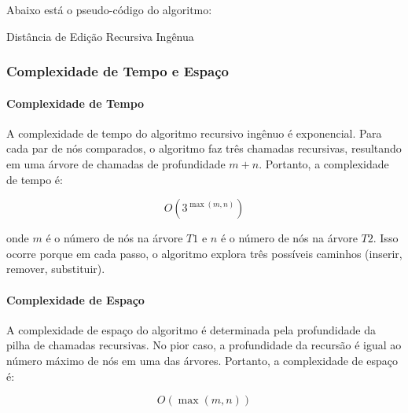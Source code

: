 \documentclass[12pt]{article}
\begin{document}
Abaixo está o pseudo-código do algoritmo:

\begin{algorithm}[H]
\caption{Distância de Edição Recursiva Ingênua}
\end{algorithm}



\subsubsection{Complexidade de Tempo e Espaço}

\paragraph{Complexidade de Tempo}

A complexidade de tempo do algoritmo recursivo ingênuo é exponencial. Para cada par de nós comparados, o algoritmo faz três chamadas recursivas, resultando em uma árvore de chamadas de profundidade $m+n$. Portanto, a complexidade de tempo é:

\[
O(3^{\max(m, n)})
\]

onde $m$ é o número de nós na árvore $T1$ e $n$ é o número de nós na árvore $T2$. Isso ocorre porque em cada passo, o algoritmo explora três possíveis caminhos (inserir, remover, substituir).

\paragraph{Complexidade de Espaço}

A complexidade de espaço do algoritmo é determinada pela profundidade da pilha de chamadas recursivas. No pior caso, a profundidade da recursão é igual ao número máximo de nós em uma das árvores. Portanto, a complexidade de espaço é:

\[
O(\max(m, n))
\]
\end{document}
